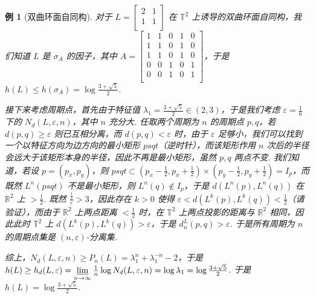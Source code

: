 \documentclass[11pt, a4paper, oneside]{ctexart}
\newtheorem{example}[theorem]{例}
\newcommand{\R}{\mathbb{R}}
\newcommand{\T}{\mathbb{T}}
\begin{document}
    \begin{example}[双曲环面自同构]
        对于 $L=\begin{bmatrix}
            2&1\\
            1&1\\
        \end{bmatrix}$ 在 $\T^2$ 上诱导的双曲环面自同构，我们知道 $L$ 是 $\sigma_A$ 的因子，其中 $A=\begin{bmatrix}
            1&1&0&1&0\\
            1&1&0&1&0\\
            1&1&0&1&0\\
            0&0&1&0&1\\
            0&0&1&0&1\\
        \end{bmatrix}$，于是 $h(L)\leq h(\sigma_A)=\log\frac{3+\sqrt{5}}{2}$.

        接下来考虑周期点，首先由于特征值 $\lambda_1=\frac{3+\sqrt{5}}{2}\in (2,3)$，于是我们考虑 $\varepsilon=\frac{1}{6}$ 下的 $N_d(L,\varepsilon,n)$，其中 $n$ 充分大. 任取两个周期为 $n$ 的周期点 $p,q$，若 $d(p,q)\geq \varepsilon$ 则已互相分离，而 $d(p,q)<\varepsilon$ 时，由于 $\varepsilon$ 足够小，我们可以找到一个以特征方向为边方向的最小矩形 $psqt$（逆时针），而该矩形作用 $n$ 次后的半径会远大于该矩形本身的半径，因此不再是最小矩形，虽然 $p,q$ 两点不变. 我们知道，若设 $p=(p_x,p_y)$，则 $psqt\subset (p_x-\frac{1}{2},p_x+\frac{1}{2})\times (p_y-\frac{1}{2},p_y+\frac{1}{2})=I_p$，而既然 $L^n(psqt)$ 不是最小矩形，则 $L^n(q)\notin I_p$，于是 $d(L^n(p),L^n(q))$ 在 $\R^2$ 上 $>\frac{1}{2}$. 既然 $\frac{\frac{1}{2}}{\varepsilon}>3$，因此存在 $k>0$ 使得 $\varepsilon<d(L^k(p),L^k(q))<\frac{1}{2}$（请验证），而由于 $\R^2$ 上两点距离 $<\frac{1}{2}$ 时，在 $\T^2$ 上两点投影的距离与 $\R^2$ 相同，因此此时 $\T^2$ 上 $d(L^k(p),L^k(q))>\varepsilon$，于是 $d_n^L(p,q)>\varepsilon$. 于是所有周期为 $n$ 的周期点集是 $(n,\varepsilon)$-分离集.
        
        综上，$N_d(L,\varepsilon,n)\geq P_n(L)=\lambda_1^n+\lambda_1^{-n}-2$，于是 $h(L)\geq h_d(L,\varepsilon)=\varliminf\limits_{n\to\infty}\frac{1}{n}\log N_d(L,\varepsilon,n)=\log \lambda_1=\log \frac{3+\sqrt{5}}{2}$. 于是 $h(L)=\log\frac{3+\sqrt{5}}{2}$.
    \end{example}
\end{document}
